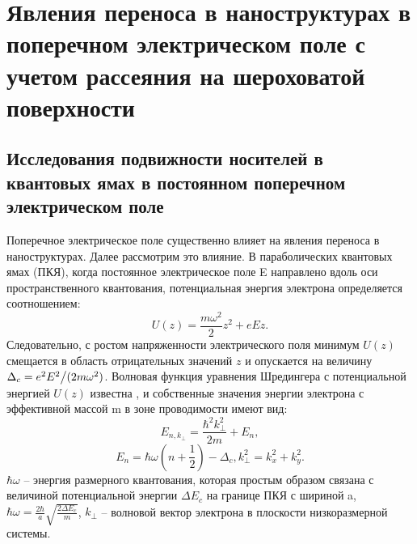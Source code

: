 \chapter{Явления переноса в наноструктурах в поперечном электрическом поле с учетом рассеяния на шероховатой поверхности} \label{chapt4}

\section{Исследования подвижности носителей в квантовых ямах в постоянном поперечном электрическом поле} \label{sect4_1}

Поперечное электрическое поле существенно влияет на явления переноса в наноструктурах. Далее рассмотрим это влияние.
В параболических квантовых ямах (ПКЯ), когда постоянное электрическое поле E направлено вдоль оси пространственного квантования, потенциальная энергия электрона определяется соотношением:
\[
U(z)=\frac{m\omega ^{2} }{2} z^{2} +eEz.
\] 
Следовательно, с ростом напряженности электрического поля минимум $U(z)$ смещается в область отрицательных значений $z$ и опускается на величину $\Delta _{c} ={e^{2} E^{2}  \mathord{\left/{\vphantom{e^{2} E^{2}  (2m\omega ^{2} }}\right.\kern-\nulldelimiterspace} (2m\omega ^{2} } )$. Волновая функция уравнения Шредингера с потенциальной энергией $U(z)$ известна \cite{Sinyavskii1998}, и собственные значения энергии электрона с эффективной массой m в зоне проводимости имеют вид:
\begin{equation} \label{eq:41_10}
E_{n,k_{\bot } } =\frac{\hbar ^{2} k_{\bot } ^{2} }{2m} +E_{n},
\end{equation}
\[
E_{n} =\hbar \omega \left(n+\frac{1}{2} \right)-\Delta _{c} , k_{\bot }^{2} =k_{x}^{2} +k_{y}^{2}.
\] 
$\hbar \omega $ -- энергия размерного квантования, которая простым образом связана с величиной потенциальной энергии $\Delta E_{c} $ на границе ПКЯ с шириной a, $\hbar \omega =\frac{2\hbar }{a} \sqrt{\frac{2\Delta E_{c} }{m} } $, $k_{\bot } $ -- волновой вектор электрона в плоскости низкоразмерной системы.

